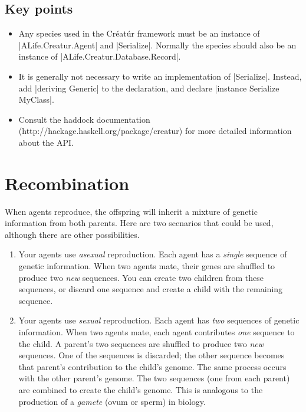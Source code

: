 \documentclass[a4paper,10pt]{report}
\begin{document}
\section{Key points}

\begin{itemize}
\item Any species used in the Créatúr framework must be an instance of |ALife.Creatur.Agent|
and |Serialize|.
Normally the species should also be an instance of |ALife.Creatur.Database.Record|.
\item It is generally not necessary to write an implementation of |Serialize|.
Instead, add |deriving Generic| to the declaration,
and declare |instance Serialize MyClass|.
\item Consult the haddock documentation (http://hackage.haskell.org/package/creatur)
for more detailed information about the API.
\end{itemize}

\chapter{Recombination}
\label{sec:recombination}

When agents reproduce, the offspring will inherit a mixture of
genetic information from both parents.
Here are two scenarios that could be used, although there are other
possibilities.

\begin{enumerate}
\item Your agents use \emph{asexual} reproduction.
Each agent has a \emph{single} sequence of genetic information.
When two agents mate, their genes are shuffled to produce
two \emph{new} sequences.
You can create two children from these sequences,
or discard one sequence and create a child with the remaining sequence.
\item Your agents use \emph{sexual} reproduction.
Each agent has \emph{two} sequences of genetic information.
When two agents mate, each agent contributes \emph{one}
sequence to the child.
A parent's two sequences are shuffled to produce two \emph{new}
sequences.
One of the sequences is discarded; the other sequence becomes
that parent's contribution to the child's genome.
The same process occurs with the other parent's genome.
The two sequences (one from each parent) are combined to create the 
child's genome.
This is analogous to the production of a \emph{gamete} (ovum or sperm) 
in biology.
\end{enumerate}
\end{document}
